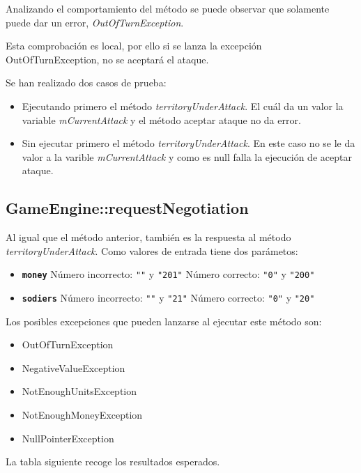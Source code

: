 Analizando el comportamiento del método se puede observar que solamente puede dar un error, \textit{OutOfTurnException}.

Esta comprobación es local, por ello si se lanza la excepción OutOfTurnException, no se aceptará el ataque.

Se han realizado dos casos de prueba:
\begin{itemize}
\item Ejecutando primero el método \textit{territoryUnderAttack}. El cuál da un valor la variable \textit{mCurrentAttack} y el método aceptar ataque no da error.
\item Sin ejecutar primero el método \textit{territoryUnderAttack}. En este caso no se le da valor a la varible \textit{mCurrentAttack} y como es null falla la ejecución de aceptar ataque.
\end{itemize}

\subsection{GameEngine::requestNegotiation}

Al igual que el método anterior, también es la respuesta al método \textit{territoryUnderAttack}. Como valores de entrada tiene dos parámetos:
\begin{itemize}
\item \textbf{\texttt{money}}
\subitem Número incorrecto: \texttt{""} y \texttt{"201"}
\subitem Número correcto: \texttt{"0"} y \texttt{"200"}

\item \textbf{\texttt{sodiers}}
\subitem Número incorrecto: \texttt{""} y \texttt{"21"}
\subitem Número correcto: \texttt{"0"} y \texttt{"20"}
\end{itemize}

Los posibles excepciones que pueden lanzarse al ejecutar este método son:
\begin{itemize}
\item OutOfTurnException
\item NegativeValueException
\item NotEnoughUnitsException
\item NotEnoughMoneyException
\item NullPointerException
\end{itemize}

La tabla siguiente recoge los resultados esperados.

